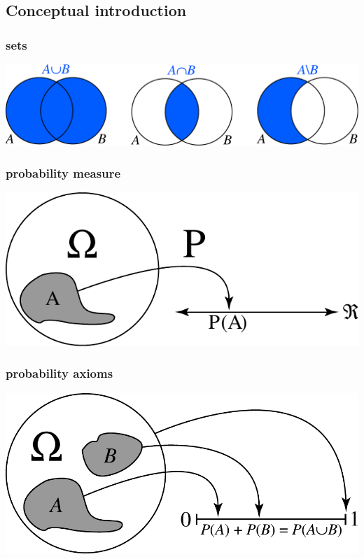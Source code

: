 \subsection{Conceptual introduction}
\begin{frame}
\frametitle{sets}
\begin{center}	
			\includegraphics[scale=0.45]{fig/setth.pdf}
	\end{center}		
\end{frame}

\begin{frame}
\frametitle{probability measure}
\begin{center}	
			\includegraphics[scale=0.45]{fig/propmeas5.pdf}
	\end{center}		
\end{frame}

\begin{frame}
\frametitle{probability axioms}
\begin{center}	
			\includegraphics[scale=0.45]{fig/probthax7.pdf}
	\end{center}		
\end{frame}

